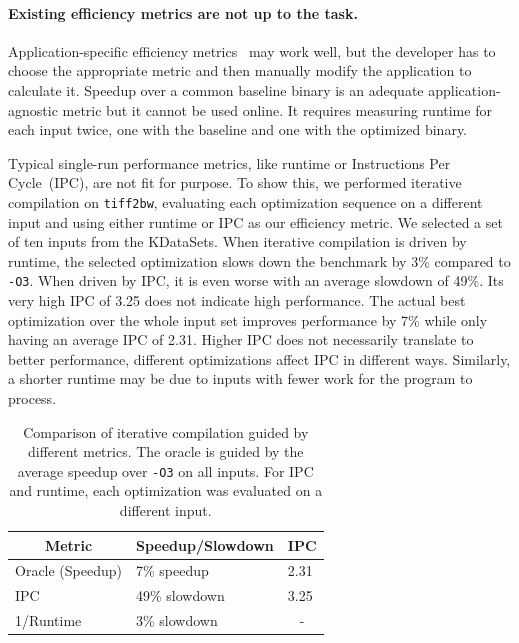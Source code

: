     \paragraph{Existing efficiency metrics are not up to the task.} Application-specific efficiency metrics~\cite{alameldeen06,coppa14} may
    work well, but the developer has to choose the appropriate metric and then manually modify the application to calculate it. Speedup
    over a common baseline binary is an adequate application-agnostic metric but it cannot be used online. It requires measuring runtime
    for each input twice, one with the baseline and one with the optimized binary.

    Typical single-run performance metrics, like runtime or Instructions Per Cycle~(IPC), are not fit for purpose. To show this, we
    performed iterative compilation on \texttt{tiff2bw}, evaluating each optimization sequence on a different input and using either
    runtime or IPC as our efficiency metric. We selected a set of ten inputs from the KDataSets. When
    iterative compilation is driven by runtime, the selected optimization slows down the benchmark by 3\% compared to \texttt{-O3}. When
    driven by IPC, it is even worse with an average slowdown of 49\%. Its very high IPC of 3.25 does not indicate high performance. The
    actual best optimization over the whole input set improves performance by 7\% while only having an average IPC of 2.31.
   Higher IPC does not necessarily translate to better performance,
 different optimizations affect IPC in different ways.
   Similarly, a shorter runtime may be due to inputs with fewer work for the program to process.

\begin{table}[h]
\centering
\label{tab:motivation_metrics}
\begin{tabular}{|l|l|l|}
\hline
\multicolumn{1}{|c|}{Metric} & \multicolumn{1}{c|}{Speedup/Slowdown} & \multicolumn{1}{c|}{IPC} \\ \hline
Oracle (Speedup)             & 7\% speedup                                 & 2.31                      \\ \hline
IPC                          & 49\% slowdown                                & 3.25                      \\ \hline
1/Runtime                    & 3\% slowdown                                  & \multicolumn{1}{c|}{-}   \\ \hline
\end{tabular}
\caption{Comparison of iterative compilation guided by different metrics.
The oracle is guided by the average speedup over \texttt{-O3} on all inputs.
For IPC and runtime, each optimization was evaluated on a different input.
}
\vspace{-2ex}
\end{table}

